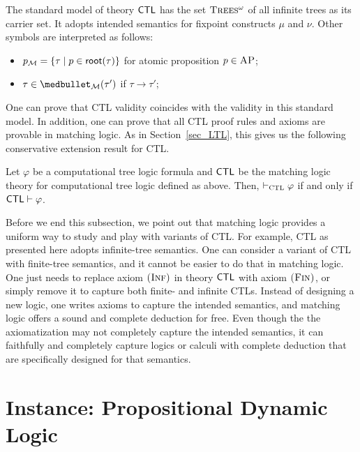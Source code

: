 \documentclass{amsart}
\begin{document}
The standard model of theory $\mathsf{CTL}$ has the set $\textsc{Trees$^\omega$}$ of all infinite
trees
as its carrier set.
It adopts intended semantics for fixpoint constructs $\mu$ and $\nu$.
Other symbols are interpreted as follows:
\begin{itemize}
	\item $p_{\mathcal{M}} = \{ \tau \mid p \in \mathsf{root}(\tau) \}$ for atomic proposition $p \in
	\textsc{AP}$;
	\item $\tau \in \snext_\MM(\tau')$ if $\tau \to \tau'$;
\end{itemize}
One can prove that CTL validity coincides with the validity in this standard
model.
In addition, one can prove that all CTL proof rules and axioms are provable
in matching logic.
As in Section~\ref{sec_LTL},
this gives us the following conservative extension result for CTL.
\begin{theorem}
	Let $\varphi$ be a computational tree logic formula
	and $\mathsf{CTL}$ be the matching logic theory for computational tree logic defined
	as above.
	Then,
	$\vdash_{\textsc{CTL}} \varphi$ if and only if
	$\mathsf{CTL} \vdash \varphi$.
\end{theorem}

Before we end this subsection, we point out that matching logic
provides a uniform way to study and play with variants of CTL.
For example, CTL as presented here adopts infinite-tree semantics.
One can consider a variant of CTL with finite-tree semantics, and it cannot be
easier
to do that in matching logic.
One just needs to replace axiom $\textsc{(Inf)}$ in theory $\mathsf{CTL}$ with axiom $\textsc{(Fin)}$,
or simply remove it to capture both finite- and infinite CTLs.
Instead of designing a new logic, one writes axioms to capture
the intended semantics, and matching logic offers a sound and complete deduction
for free.
Even though the the axiomatization may not completely capture the intended
semantics,
it can faithfully and completely capture logics or calculi with complete
deduction
that are specifically designed for that semantics.


\section{Instance: Propositional Dynamic Logic}
\end{document}
